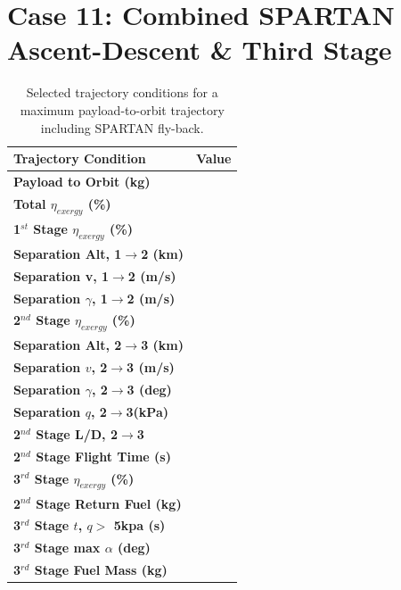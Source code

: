 \section{Case 11: Combined SPARTAN Ascent-Descent \& Third Stage}
\begin{table}[ht]
	\centering
\begin{tabular}{l c } 
	\hline \textbf{Trajectory Condition}
	& Value

	\\
	\hline \textbf{Payload to Orbit (kg)}
	& \textbf{\PayloadToOrbitStandard}
	\\
	\textbf{Total $\eta_{exergy}$ (\%)}
	& \textbf{\totalExergyEffStandard}
	\\
	\hline 
	\textbf{1$^{st}$ Stage $\eta_{exergy}$ (\%)}
	& \textbf{\firstExergyEffStandard}
	\\
	\textbf{Separation Alt, 1$\rightarrow$2 (km)}
	& \firstsecondSeparationAltStandard
	\\
	\textbf{Separation v, 1$\rightarrow$2 (m/s)}
	& \firstsecondSeparationvStandard
	\\
	\textbf{Separation $\gamma$, 1$\rightarrow$2 (m/s)}
	& \firstsecondSeparationgammaStandard
	\\
	\hline 
	\textbf{2$^{nd}$ Stage $\eta_{exergy}$ (\%)}
	& \textbf{\secondExergyEffStandard}
	\\
	\textbf{Separation Alt, 2$\rightarrow$3 (km)}
	& \secondthirdSeparationAltStandard
	\\
	\textbf{Separation $v$, 2$\rightarrow$3 (m/s)}
	& \secondthirdSeparationvStandard
	\\
	\textbf{Separation $\gamma$, 2$\rightarrow$3 (deg)}
	& \secondthirdSeparationgammaStandard
	\\
	\textbf{Separation $q$, 2$\rightarrow$3(kPa)}
	& \secondthirdSeparationqStandard
	\\
	\textbf{2$^{nd}$ Stage L/D, 2$\rightarrow$3}
	& \secondthirdSeparationLDStandard
	\\
	\textbf{2$^{nd}$ Stage Flight Time (s)}
	& \secondFlightTimeStandard
	\\
	\hline 
	\textbf{3$^{rd}$ Stage $\eta_{exergy}$ (\%)}
	& \textbf{\thirddExergyEffStandard}
	\\
	\textbf{2$^{nd}$ Stage Return Fuel (kg)}
	& \returnFuelStandard
	\\
	\textbf{3$^{rd}$ Stage $t$, $q >$ 5kpa (s)}
	& \thirdqOverFiveStandard
	\\
	\textbf{3$^{rd}$ Stage max $\alpha$ (deg)}
	& \thirdmaxAoAStandard
	\\
	\textbf{3$^{rd}$ Stage Fuel Mass (kg)}
	& \thirdmFuelStandard
	\\
	\hline 
\end{tabular} 
\caption{Selected trajectory conditions for a maximum payload-to-orbit trajectory including SPARTAN fly-back.}
\end{table}

